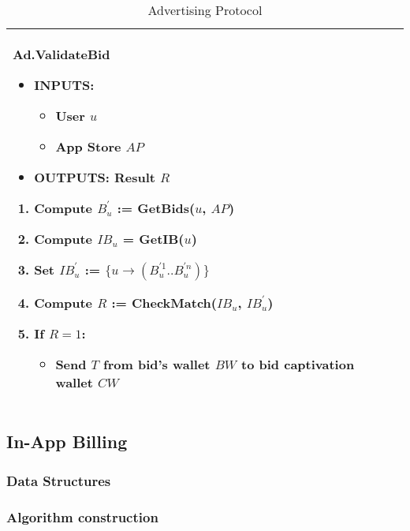\begin{table}[h]
\begin{tabular}{|p{}p{}|}
\textsf{Ad.ValidateBid}
\begin{itemize}
	\vspace{-0.3cm}
	\item INPUTS:
	\vspace{-0.4cm}
	\begin{itemize}
		\item User $u$
		\item App Store $AP$
	\end{itemize}
	\item OUTPUTS: Result $R$
\end{itemize}
\begin{enumerate}
	\item Compute $B^{'}_{u}$ := \textsf{GetBids}($u$, $AP$)
	\item Compute $IB_u$ = \textsf{GetIB}($u$)
	\item Set $IB^{'}_{u}$ := $\{u \to (B^{'1}_{u}..B^{'n}_{u})\}$
	\item Compute $R$ := \textsf{CheckMatch}($IB_u$, $IB^{'}_{u}$)
	\item If $R = 1$:
	\begin{itemize}
		\item Send $T$ from bid's wallet $BW$ to bid captivation wallet $CW$
	\end{itemize}
\end{enumerate} & \\
\hline
\end{tabular}
\caption{Advertising Protocol}
\label{table: ads_protocol}
\end{table}

\subsection{In-App Billing}

\subsubsection{Data Structures}

\subsubsection{Algorithm construction}








